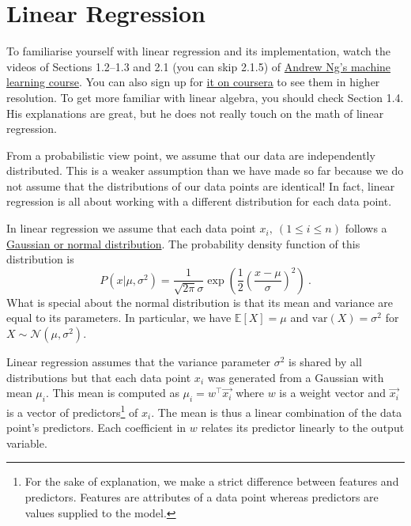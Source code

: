 \documentclass[11pt, leqno, a4paper]{article}
\begin{document}
\section{Linear Regression}
To familiarise yourself with linear regression and its implementation, watch the
videos of Sections 1.2--1.3 and 2.1 (you can skip 2.1.5) of \href{https://www.youtube.com/watch?v=n1qyTXRdWQg&index=5&list=PL0Smm0jPm9WcCsYvbhPCdizqNKps69W4Z}{Andrew Ng's machine
learning course}. You can also sign up for \href{https://www.coursera.org/learn/machine-learning/home}{it on coursera} to see them
in higher resolution. To get more familiar with linear algebra, you should check Section 1.4. His explanations are great, but he does not really touch on the math of linear regression.

From a probabilistic view point, we assume that our data are independently distributed. This is a weaker
assumption than we have made so far because we do not assume that the distributions of our data points
are identical! In fact, linear regression is all about working with a different distribution for each
data point. 

In linear regression we assume that each data point $ x_{i},\ (1 \leq i \leq n) $ follows a 
\href{https://en.wikipedia.org/wiki/Normal_distribution}{Gaussian or normal distribution}. The probability
density function of this distribution is
\begin{equation}
P(x|\mu, \sigma^{2}) = \frac{1}{\sqrt{2\pi}\sigma}\exp\left(\frac{1}{2}\left(\frac{x - \mu}{\sigma}\right)^{2}\right) \ .
\end{equation}
What is special about the normal distribution is that its mean and variance are equal to its parameters.
In particular, we have $ \mathbb{E}[X] = \mu $ and $ \text{var}(X) = \sigma^{2} $ for 
$ X \sim \mathcal{N}(\mu, \sigma^{2}) $.

Linear regression assumes that the variance parameter $ \sigma^{2} $ is shared by all distributions
but that each data point $ x_{i} $ was generated from a Gaussian with mean $ \mu_{i} $. This mean
is computed as $ \mu_{i} = w^{\top}\vec{x_{i}} $ where $ w $ is a weight vector and $ \vec{x_{i}} $ is
a vector of predictors\footnote{For the sake of explanation, we make a strict difference between
features and predictors. Features are attributes of a data point whereas predictors are values
supplied to the model.} of $ x_{i} $. The mean is thus a linear combination of the data point's predictors.
Each coefficient in $ w $ relates its predictor linearly to the output variable.
\end{document}
